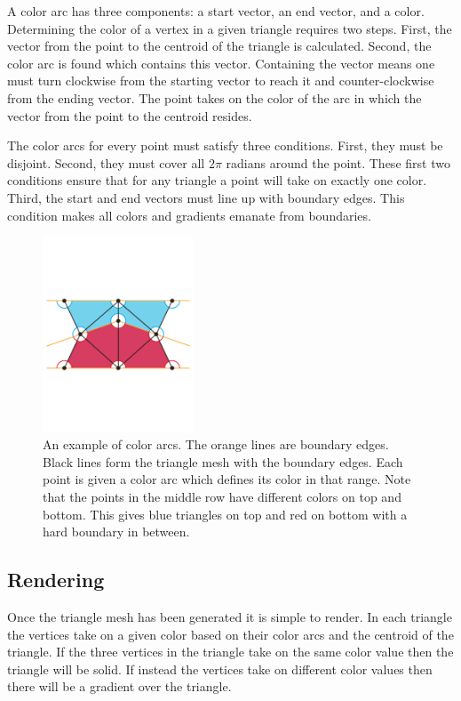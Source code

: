 \documentclass[review]{acmsiggraph}
\begin{document}
A color arc has three components: a start vector, an end vector, and a color. 
Determining the color of a vertex in a given triangle requires two steps. First,
the vector from the point to the centroid of the triangle is calculated. Second,
the color arc is found which contains this vector. Containing the vector means one must turn
clockwise from the starting vector to reach it and counter-clockwise from the ending vector.
The point takes on the color of the arc in which the vector from the point to the centroid resides.

The color arcs for every point must satisfy three conditions. First, they must be disjoint. Second,
they must cover all $2\pi$ radians around the point. These first two conditions ensure that for any
triangle a point will take on exactly one color. Third, the start and end vectors must line up
with boundary edges. This condition makes all colors and gradients emanate from boundaries.

\begin{figure}
    \centering
        \includegraphics[width=0.4\textwidth]{images/colorarcs}
    \caption{An example of color arcs. The orange lines are boundary edges. Black lines form the triangle
    mesh with the boundary edges. Each point is given a color arc which defines its color in that range.
    Note that the points in the middle row have different colors on top and bottom. This gives blue
    triangles on top and red on bottom with a hard boundary in between.}
\end{figure}

\subsection{Rendering}
Once the triangle mesh has been generated it is simple to render. In each triangle the vertices
take on a given color based on their color arcs and the centroid of the triangle. If the three
vertices in the triangle take on the same color value then the triangle will be solid. If instead the 
vertices take on different color values then there will be a gradient over the triangle.
\end{document}
